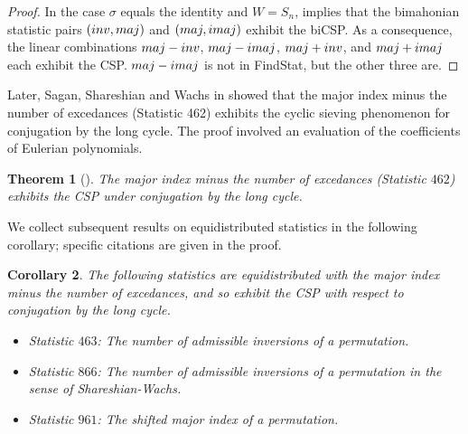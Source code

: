 \documentclass{amsart}
\newtheorem{thm}{Theorem}[section]
\newtheorem{cor}[thm]{Corollary}
\theoremstyle{definition}
\newcommand{\inv}{\textnormal{inv}}
\newcommand{\maj}{\textnormal{maj}}
\newcommand{\imaj}{\textnormal{imaj}}
\begin{document}
\begin{proof}
  In the case $\sigma$ equals the identity and $W=S_n$, \cite[Theorem 1.4]{BRS}  implies that the bimahonian statistic pairs $(\inv,\maj)$ and $(\maj,\imaj)$ exhibit the biCSP. As a consequence, the linear combinations $\maj-\inv$, $\maj-\imaj$, $\maj+\inv$, and $\maj+\imaj$ each exhibit the CSP. $\maj-\imaj$ is not in FindStat, but the other three are.
\end{proof}

Later, Sagan, Shareshian and Wachs  in \cite[Theorem 1.2]{SSW} showed that the major index minus the number of excedances (Statistic 462) exhibits the cyclic sieving phenomenon for conjugation by the long cycle.  The proof involved an evaluation of the coefficients of Eulerian polynomials. 


\begin{thm}[] The major index minus the number of excedances (Statistic $462$) exhibits the CSP under conjugation by the long cycle.
\end{thm}

We collect subsequent results on equidistributed statistics in the following corollary; specific citations are given in the proof.
\begin{cor}
The following statistics are equidistributed with the major index minus the number of excedances, and so exhibit the CSP with respect to conjugation by the long cycle.
\begin{itemize}
    \item Statistic $463$: The number of admissible inversions of a permutation.
    \item Statistic $866$: The number of admissible inversions of a permutation in the sense of Shareshian-Wachs.
    \item Statistic $961$: The shifted major index of a permutation.
  \end{itemize}
  \end{cor}
\end{document}
